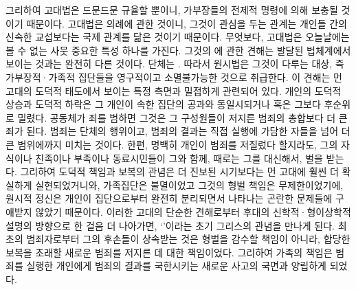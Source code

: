 그리하여 고대법은 드문드문 규율할 뿐이니,
가부장들의 전제적 명령에 의해 보충될 것이기 때문이다.
고대법은 의례에 관한 것이니,
그것이 관심을 두는 관계는
개인들 간의 신속한 교섭보다는
국제 관계를 닮은 것이기 때문이다.
무엇보다, 고대법은 오늘날에는 볼 수 없는 사뭇 중요한 특성 하나를 가진다.
그것의 에 관한 견해는
발달된 법체계에서 보이는 것과는 완전히 다른 것이다.
단체는 .
따라서 원시법은 그것이 다루는 대상, 즉 가부장적^^b7가족적 집단들을
영구적이고 소멸불가능한 것으로 취급한다.
이 견해는 먼 고대의 도덕적 태도에서 보이는 특정 측면과 밀접하게 관련되어 있다.
개인의 도덕적 상승과 도덕적 하락은 그 개인이 속한 집단의 공과와
동일시되거나 혹은 그보다 후순위로 밀렸다.
공동체가 죄를 범하면
그것은 그 구성원들이 저지른 범죄의 총합보다 더 큰 죄가 된다.
범죄는 단체의 행위이고,
범죄의 결과는 직접 실행에 가담한 자들을 넘어 더 큰 범위에까지 미치는 것이다.
한편, 명백히 개인이 범죄를 저질렀다 할지라도,
그의 자식이나 친족이나 부족이나 동료시민들이 그와 함께,
때로는 그를 대신해서, 벌을 받는다.
그리하여 도덕적 책임과 보복의 관념은
더 진보된 시기보다는 먼 고대에 훨씬 더 확실하게 실현되었거니와,
가족집단은 불멸이었고 그것의 형벌 책임은 무제한이었기에,
원시적 정신은 개인이 집단으로부터 완전히 분리되면서 나타나는 곤란한 문제들에
구애받지 않았기 때문이다.
이러한 고대의 단순한 견해로부터 후대의 신학적^^b7형이상학적 설명의 방향으로
한 걸음 더 나아가면,
`'이라는 초기 그리스의 관념을 만나게 된다.
최초의 범죄자로부터 그의 후손들이 상속받는 것은
형벌을 감수할 책임이 아니라,
합당한 보복을 초래할
새로운 범죄를 저지른 데 대한 책임이었다.
그리하여 가족의 책임은
범죄를 실행한 개인에게 범죄의 결과를 국한시키는 새로운 사고의 국면과
양립하게 되었다.

